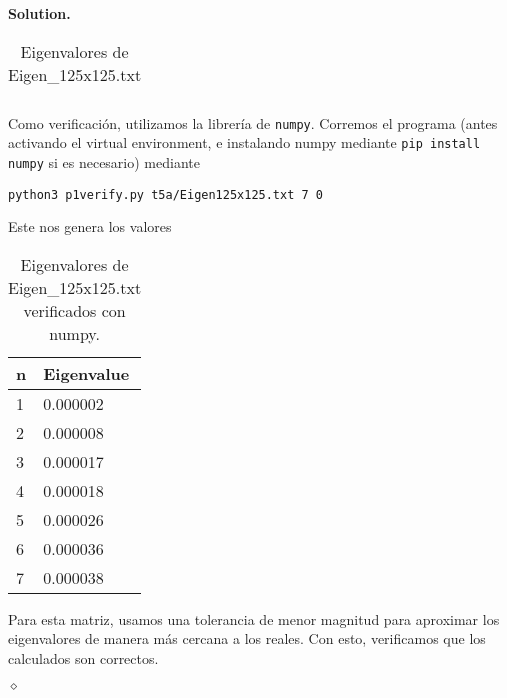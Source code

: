 \documentclass{article}
\theoremstyle{problemstyle}
\newenvironment{solution}{%
  \begin{mdframed}[linewidth=0.8pt,linecolor=Gray,backgroundcolor=Gray!5,roundcorner=5pt]%
  \noindent\textbf{Solution.}%
}{%
\hfill $ \diamond $ 
  \end{mdframed}%
}
\begin{document}
\begin{solution}
\begin{enumerate}
\begin{table}[H]
\begin{center}
\begin{tabular}{|l|l|}
					      \hline
				      \end{tabular}
			      \end{center}
			      \caption{Eigenvalores de Eigen\_125x125.txt}\label{tab:inv125x125}
		      \end{table}
		      Como verificaci\'on, utilizamos la librer\'ia de \texttt{numpy}. Corremos el programa (antes activando el virtual environment, e instalando numpy mediante \texttt{pip install numpy} si es necesario) mediante
		      \begin{center}
			      \texttt{python3 p1\textunderscore verify.py t5a/Eigen\textunderscore125x125.txt 7 0}
		      \end{center}
		      Este nos genera los valores
		      \begin{table}[H]
			      \begin{center}
				      \begin{tabular}{|l|l|}
					      \hline
					      n & Eigenvalue \\
					      \hline
					      1 & 0.000002\\
					      \hline
					      2 & 0.000008\\
					      \hline
					      3 &0.000017\\
					      \hline
					      4 & 0.000018\\
					      \hline
					      5 & 0.000026\\
					      \hline
					      6 & 0.000036\\
					      \hline
					      7 & 0.000038\\
					      \hline
				      \end{tabular}
			      \end{center}
			      \caption{Eigenvalores de Eigen\_125x125.txt verificados con numpy.}\label{tab:invpy125x125}
		      \end{table}
          Para esta matriz, usamos una tolerancia de menor magnitud para aproximar los eigenvalores de manera m\'as cercana a los reales. Con esto, verificamos que los calculados son correctos.
	\end{enumerate}

\end{solution}



\end{document}
